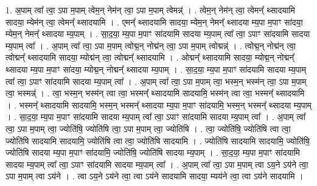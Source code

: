 \documentclass[17pt]{extarticle}
\begin{document}
1. अ॒पाम् त्वा᳚ त्वा॒ ऽपा म॒पाम् त्वेम॒न् नेम॑न् त्वा॒ ऽपा म॒पाम् त्वेमन्न्॑ । . त्वेम॒न् नेम॑न् त्वा॒ त्वेमन्᳚ थ्सादयामि सादया॒ म्येम॑न् त्वा॒ त्वेमन्᳚ थ्सादयामि । . एमन्᳚ थ्सादयामि सादया॒ म्येम॒न् नेमन्᳚ थ्सादया म्य॒पा म॒पाꣳ सा॑दया॒ म्येम॒न् नेमन्᳚ थ्सादया म्य॒पाम् । . सा॒द॒या॒ म्य॒पा म॒पाꣳ सा॑दयामि सादया म्य॒पाम् त्वा᳚ त्वा॒ ऽपाꣳ सा॑दयामि सादया म्य॒पाम् त्वा᳚ । . अ॒पाम् त्वा᳚ त्वा॒ ऽपा म॒पाम् त्वोद्म॒न् नोद्म॑न् त्वा॒ ऽपा म॒पाम् त्वोद्मन्न्॑ । . त्वोद्म॒न् नोद्म॑न् त्वा॒ त्वोद्मन्᳚ थ्सादयामि सादया॒ म्योद्म॑न् त्वा॒ त्वोद्मन्᳚ थ्सादयामि । . ओद्मन्᳚ थ्सादयामि सादया॒ म्योद्म॒न् नोद्मन्᳚ थ्सादया म्य॒पा म॒पाꣳ सा॑दया॒ म्योद्म॒न् नोद्मन्᳚ थ्सादया म्य॒पाम् । . सा॒द॒या॒ म्य॒पा म॒पाꣳ सा॑दयामि सादया म्य॒पाम् त्वा᳚ त्वा॒ ऽपाꣳ सा॑दयामि सादया म्य॒पाम् त्वा᳚ । . अ॒पाम् त्वा᳚ त्वा॒ ऽपा म॒पाम् त्वा॒ भस्म॒न् भस्म॑न् त्वा॒ ऽपा म॒पाम् त्वा॒ भस्मन्न्॑ । . त्वा॒ भस्म॒न् भस्म॑न् त्वा त्वा॒ भस्मन्᳚ थ्सादयामि सादयामि॒ भस्म॑न् त्वा त्वा॒ भस्मन्᳚ थ्सादयामि । . भस्मन्᳚ थ्सादयामि सादयामि॒ भस्म॒न् भस्मन्᳚ थ्सादया म्य॒पा म॒पाꣳ सा॑दयामि॒ भस्म॒न् भस्मन्᳚ थ्सादया म्य॒पाम् । . सा॒द॒या॒ म्य॒पा म॒पाꣳ सा॑दयामि सादया म्य॒पाम् त्वा᳚ त्वा॒ ऽपाꣳ सा॑दयामि सादया म्य॒पाम् त्वा᳚ । . अ॒पाम् त्वा᳚ त्वा॒ ऽपा म॒पाम् त्वा॒ ज्योति॑षि॒ ज्योति॑षि त्वा॒ ऽपा म॒पाम् त्वा॒ ज्योति॑षि । . त्वा॒ ज्योति॑षि॒ ज्योति॑षि त्वा त्वा॒ ज्योति॑षि सादयामि सादयामि॒ ज्योति॑षि त्वा त्वा॒ ज्योति॑षि सादयामि । . ज्योति॑षि सादयामि सादयामि॒ ज्योति॑षि॒ ज्योति॑षि सादया म्य॒पा म॒पाꣳ सा॑दयामि॒ ज्योति॑षि॒ ज्योति॑षि सादया म्य॒पाम् । . सा॒द॒या॒ म्य॒पा म॒पाꣳ सा॑दयामि सादया म्य॒पाम् त्वा᳚ त्वा॒ ऽपाꣳ सा॑दयामि सादया म्य॒पाम् त्वा᳚ । . अ॒पाम् त्वा᳚ त्वा॒ ऽपा म॒पाम् त्वा ऽय॒ने ऽय॑ने त्वा॒ ऽपा म॒पाम् त्वा ऽय॑ने । . त्वा ऽय॒ने ऽय॑ने त्वा॒ त्वा ऽय॑ने सादयामि सादया॒ म्यय॑ने त्वा॒ त्वा ऽय॑ने सादयामि । \newline
\end{document}
